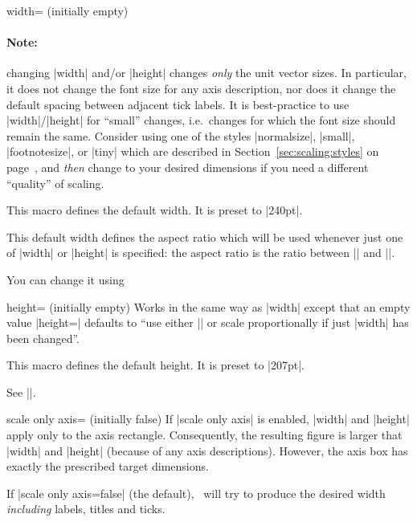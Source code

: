 \begin{pgfplotskey}{width= (initially empty)}
	\paragraph{Note:} changing |width| and/or |height| changes \emph{only} the unit vector sizes. In particular, it does not change the font size for any axis description, nor does it change the default spacing between adjacent tick labels. It is best-practice to use |width|/|height| for ``small'' changes, i.e.\ changes for which the font size should remain the same. Consider using one of the styles |normalsize|, |small|, |footnotesize|, or |tiny| which are described in Section~\ref{sec:scaling:styles} on page~\pageref{sec:scaling:styles}, and \emph{then} change to your desired dimensions if you need a different ``quality'' of scaling.

	\begin{command}{\axisdefaultwidth}
		This macro defines the default width. It is preset to |240pt|.

		This default width defines the aspect ratio which will be used whenever just one of |width| or |height| is specified: the aspect ratio is the ratio between |\axisdefaultwidth| and |\axisdefaultheight|.

		You can change it using
\begin{codeexample}
\def\axisdefaultwidth{10cm}
\end{codeexample}
	\end{command}
\end{pgfplotskey}

\begin{pgfplotskey}{height= (initially empty)}
	Works in the same way as |width| except that an empty value |height={}| defaults to ``use either |\axisdefaultheight| or scale proportionally if just |width| has been changed''.

	\begin{command}{\axisdefaultheight}
		This macro defines the default height. It is preset to |207pt|.	

		See |\axisdefaultwidth|.
	\end{command}
\end{pgfplotskey}

\begin{pgfplotskey}{scale only axis= (initially false)}
If |scale only axis| is enabled, |width| and |height| apply only to the axis rectangle. Consequently, the resulting figure is larger that |width| and |height| (because of any axis descriptions). However, the axis box has exactly the prescribed target dimensions.

If |scale only axis=false| (the default), \PGFPlots\ will try to produce the desired width \emph{including} labels, titles and ticks.
\end{pgfplotskey}

